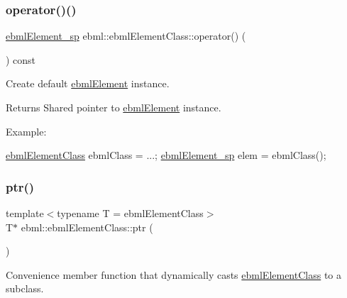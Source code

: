 \mbox{\label{classebml_1_1ebmlElementClass_a45bdca04f3008152ad7df0856ef8724b}} 
\subsubsection{\texorpdfstring{operator()()}{operator()()}}
{\footnotesize\ttfamily \mbox{\hyperlink{namespaceebml_adad533b7705a16bb360fe56380c5e7be}{ebml\+Element\+\_\+sp}} ebml\+::ebml\+Element\+Class\+::operator() (\begin{DoxyParamCaption}{ }\end{DoxyParamCaption}) const}

Create default \mbox{\hyperlink{classebml_1_1ebmlElement}{ebml\+Element}} instance.

\begin{DoxyReturn}{Returns}
Shared pointer to \mbox{\hyperlink{classebml_1_1ebmlElement}{ebml\+Element}} instance.
\end{DoxyReturn}
Example\+: 
\begin{DoxyCode}
\mbox{\hyperlink{classebml_1_1ebmlElementClass_a6c2081870c5d66c70e0cf988ff253420}{ebmlElementClass}} ebmlClass = ...;
\mbox{\hyperlink{namespaceebml_adad533b7705a16bb360fe56380c5e7be}{ebmlElement\_sp}} elem = ebmlClass();
\end{DoxyCode}
 \mbox{\label{classebml_1_1ebmlElementClass_a485c3f4a11b09d301b80f44e1802e9ab}} 
\subsubsection{\texorpdfstring{ptr()}{ptr()}\hspace{0.1cm}{\footnotesize\ttfamily [1/2]}}
{\footnotesize\ttfamily template$<$typename T  = ebml\+Element\+Class$>$ \\
T$\ast$ ebml\+::ebml\+Element\+Class\+::ptr (\begin{DoxyParamCaption}{ }\end{DoxyParamCaption})\hspace{0.3cm}{\ttfamily [inline]}}

Convenience member function that dynamically casts \mbox{\hyperlink{classebml_1_1ebmlElementClass}{ebml\+Element\+Class}} to a subclass.

